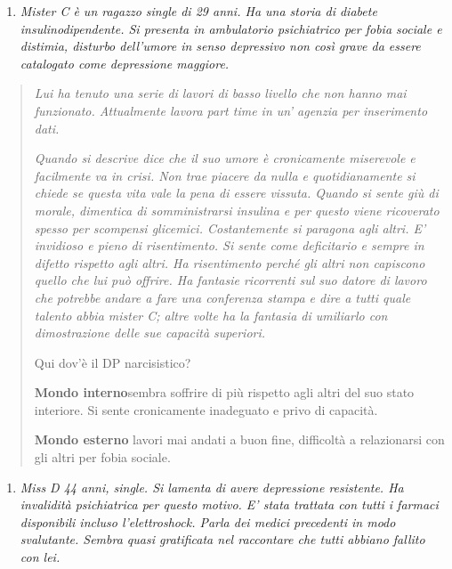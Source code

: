 \documentclass[]{article}
\begin{document}
\begin{enumerate}
\def\labelenumi{\arabic{enumi}.}
\item
  \emph{Mister C è un ragazzo single di 29 anni. Ha una storia di
  diabete insulinodipendente. Si presenta in ambulatorio psichiatrico
  per fobia sociale e distimia, disturbo dell'umore in senso depressivo
  non così grave da essere catalogato come depressione maggiore. }
\end{enumerate}

\begin{quote}
\emph{Lui ha tenuto una serie di lavori di basso livello che non hanno
mai funzionato. Attualmente lavora part time in un' agenzia per
inserimento dati. }

\emph{Quando si descrive dice che il suo umore è cronicamente miserevole
e facilmente va in crisi. Non trae piacere da nulla e quotidianamente si
chiede se questa vita vale la pena di essere vissuta. Quando si sente
giù di morale, dimentica di somministrarsi insulina e per questo viene
ricoverato spesso per scompensi glicemici. Costantemente si paragona
agli altri. E' invidioso e pieno di risentimento. Si sente come
deficitario e sempre in difetto rispetto agli altri. Ha risentimento
perché gli altri non capiscono quello che lui può offrire. Ha fantasie
ricorrenti sul suo datore di lavoro che potrebbe andare a fare una
conferenza stampa e dire a tutti quale talento abbia mister C; altre
volte ha la fantasia di umiliarlo con dimostrazione delle sue capacità
superiori.}

Qui dov'è il DP narcisistico?

\textbf{Mondo interno}sembra soffrire di più rispetto agli altri del suo
stato interiore. Si sente cronicamente inadeguato e privo di capacità.

\textbf{Mondo esterno} lavori mai andati a buon fine, difficoltà a
relazionarsi con gli altri per fobia sociale.
\end{quote}

\begin{enumerate}
\def\labelenumi{\arabic{enumi}.}
\item
  \emph{Miss D 44 anni, single. Si lamenta di avere depressione
  resistente. Ha invalidità psichiatrica per questo motivo. E' stata
  trattata con tutti i farmaci disponibili incluso l'elettroshock. Parla
  dei medici precedenti in modo svalutante. Sembra quasi gratificata nel
  raccontare che tutti abbiano fallito con lei. }
\end{enumerate}
\end{document}
